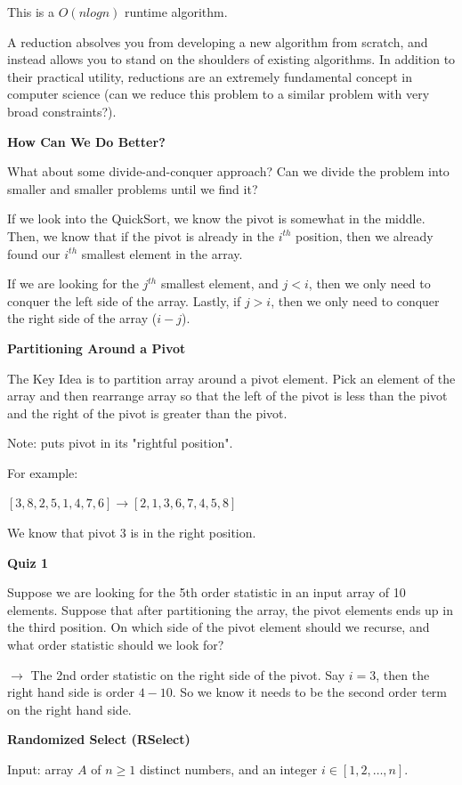 \documentclass[11pt]{article}
\newcommand{\myeq}[1]{
    \vspace{11pt}
    \begin{center}
        ${#1}$
    \end{center}
    \vspace{11pt}
}
\newcommand{\boldsec}[1]{
    \vspace{11pt}
    \textbf{#1}
    \vspace{11pt}
}
\begin{document}
This is a $O(nlogn)$ runtime algorithm.

A reduction absolves you from developing a new algorithm from scratch, and instead allows you to stand on the shoulders of existing algorithms. In addition to their practical utility, reductions are an extremely fundamental concept in computer science (can we reduce this problem to a similar problem with very broad constraints?).

\boldsec{How Can We Do Better?}

What about some divide-and-conquer approach? Can we divide the problem into smaller and smaller problems until we find it?

If we look into the QuickSort, we know the pivot is somewhat in the middle. Then, we know that if the pivot is already in the $i^{th}$ position, then we already found our $i^{th}$ smallest element in the array.

If we are looking for the $j^{th}$ smallest element, and $j < i$, then we only need to conquer the left side of the array. Lastly, if $j > i$, then we only need to conquer the right side of the array ($i-j$).

\boldsec{Partitioning Around a Pivot}

The Key Idea is to partition array around a pivot element. Pick an element of the array and then rearrange array so that the left of the pivot is less than the pivot and the right of the pivot is greater than the pivot.

Note: puts pivot in its "rightful position".

For example:

\myeq{[3,8,2,5,1,4,7,6] \to [2,1,3,6,7,4,5,8]}

We know that pivot 3 is in the right position.

\boldsec{Quiz 1}

Suppose we are looking for the 5th order statistic in an input array of 10 elements. Suppose that after partitioning the array, the pivot elements ends up in the third position. On which side of the pivot element should we recurse, and what order statistic should we look for? 

$\to$ The 2nd order statistic on the right side of the pivot. Say $i=3$, then the right hand side is order $4-10$. So we know it needs to be the second order term on the right hand side.

\boldsec{Randomized Select (RSelect)}

Input: array $A$ of $n \geq 1$ distinct numbers, and an integer $i \in [1,2,\dots,n]$.
\end{document}

